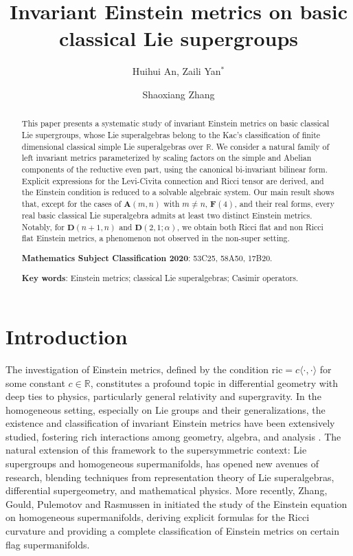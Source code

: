 \documentclass[reqno]{amsart}
\title{Invariant Einstein  metrics on basic classical  Lie supergroups}
\author{Huihui An,  Zaili Yan$^{*}$ \and Shaoxiang Zhang}
\date{}
\theoremstyle{definition}
\begin{document}
\maketitle
\begin{abstract}
This paper presents a systematic study of invariant Einstein metrics on basic classical Lie supergroups, whose Lie superalgebras belong to the Kac's classification of finite dimensional classical simple Lie superalgebras over $\mathbb{R}$. We consider a natural family of left invariant metrics parameterized by scaling factors on the simple and Abelian components of the reductive even part, using the canonical bi-invariant bilinear form. Explicit expressions for the Levi-Civita connection and Ricci tensor are derived, and the Einstein condition is reduced to a solvable algebraic system.
Our main result shows that, except for the cases of $\mathbf{A}(m,n)$ with $m\neq n$, $\mathbf{F}(4)$,  and their real forms, every  real basic classical Lie superalgebra
admits at least  two distinct Einstein metrics.
Notably, for $\mathbf{D}(n+1,n)$ and $\mathbf{D}(2,1;\alpha)$, we obtain both Ricci flat and non Ricci flat Einstein metrics, a phenomenon not observed in the non-super setting.

\medskip
\textbf{Mathematics Subject Classification 2020}:   53C25, 58A50, 17B20.

\medskip
\textbf{Key words}: Einstein metrics; classical Lie superalgebras;  Casimir operators.

\end{abstract}

\section{Introduction}
The investigation of Einstein metrics, defined by the condition $\mathrm{ric}=c\langle\cdot, \cdot\rangle$ for some constant $c\in\mathbb{R}$, constitutes a profound topic in differential geometry with deep ties to physics, particularly general relativity and supergravity. In the homogeneous setting, especially on Lie groups and their generalizations, the existence and classification of invariant Einstein metrics have been extensively studied,
 fostering rich interactions among geometry, algebra, and analysis \cite{bk23,bl23,bwz04,heb98,Jab23,lau10}.
 The natural extension of this framework to the supersymmetric context: Lie supergroups and homogeneous supermanifolds,
  has opened new avenues of research, blending techniques from representation theory of Lie superalgebras, differential supergeometry, and mathematical physics.
  More recently,  Zhang, Gould, Pulemotov and Rasmussen in \cite{ZGPR24} initiated the study of the Einstein equation on homogeneous supermanifolds, deriving explicit formulas for the Ricci curvature and providing a complete classification of Einstein metrics on certain flag supermanifolds.
\end{document}
